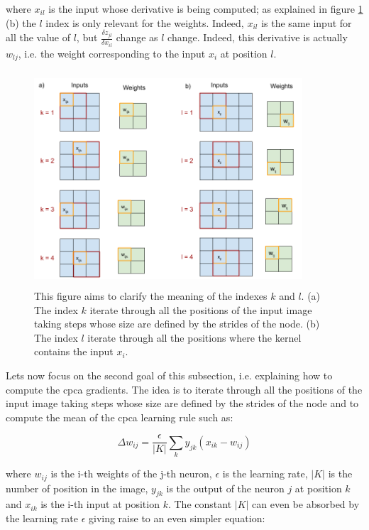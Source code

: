 \documentclass[11pt]{report}
\begin{document}
\noindent where $x_{il}$ is the input whose derivative is being computed; as explained in figure \ref{k_weights_vs_inputs} (b) the $l$ index is only relevant for the weights. Indeed, $x_{il}$ is the same input for all the value of $l$, but $\frac{\delta z_{jl}}{\delta x_{il}}$ change as $l$ change. Indeed, this derivative is actually $w_{lj}$, i.e. the weight corresponding to the input $x_{i}$ at position $l$.

\begin{figure}[h]
\centering
\includegraphics[width=10cm, height=8cm]{k_weights_vs_inputs}
\caption[Backpropagation in convoluational layers: meaning of indexes]{This figure aims to clarify the meaning of the indexes $k$ and $l$. (a) The index $k$ iterate through all the positions of the input image taking steps whose size are defined by the strides of the node. (b) The index $l$ iterate through all the positions where the kernel contains the input $x_i$.}
\label{k_weights_vs_inputs}
\end{figure}

\noindent Lets now focus on the second goal of this subsection, i.e. explaining how to compute the \acrshort{cpca} gradients. The idea is to iterate through all the positions of the input image taking steps whose size are defined by the strides of the node and to compute the mean of the \acrshort{cpca} learning rule such as:

\begin{equation}
\Delta w_{ij} = \frac{\epsilon}{|K|} \sum_{k} y_{jk}(x_{ik} - w_{ij})
\end{equation}

\noindent where $w_{ij}$ is the i-th weights of the j-th neuron, $\epsilon$ is the learning rate, $|K|$ is the number of position in the image, $y_{jk}$ is the output of the neuron $j$ at position $k$ and $x_{ik}$ is the i-th input at position $k$. The constant $|K|$ can even be absorbed by the learning rate $\epsilon$ giving raise to an even simpler equation:
\end{document}
